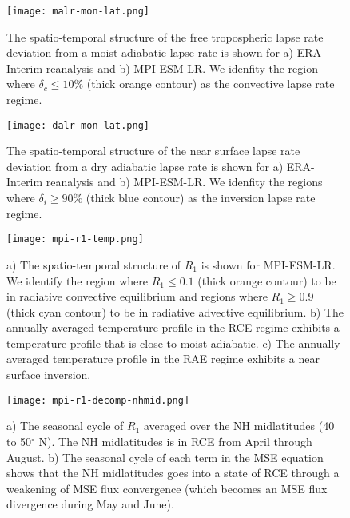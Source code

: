 \documentclass{ametsocV5}
\begin{document}
\begin{figure}[t]
  \noindent\texttt{[image: malr-mon-lat.png]}\\
  \caption{The spatio-temporal structure of the free tropospheric lapse rate deviation from a moist adiabatic lapse rate is shown for a) ERA-Interim reanalysis and b) MPI-ESM-LR. We idenfity the region where \(\delta_{c}\le 10\%\) (thick orange contour) as the convective lapse rate regime.}
  \label{fig:malr-mon-lat}
\end{figure}

\begin{figure}[t]
  \noindent\texttt{[image: dalr-mon-lat.png]}\\
  \caption{The spatio-temporal structure of the near surface lapse rate deviation from a dry adiabatic lapse rate is shown for a) ERA-Interim reanalysis and b) MPI-ESM-LR. We idenfity the regions where \(\delta_{i}\ge 90\%\) (thick blue contour) as the inversion lapse rate regime.}
  \label{fig:dalr-mon-lat}
\end{figure}

\begin{figure}[t]
  \noindent\texttt{[image: mpi-r1-temp.png]}\\
  \caption{a) The spatio-temporal structure of \(R_{1}\) is shown for MPI-ESM-LR. We identify the region where \(R_{1}\le 0.1\) (thick orange contour) to be in radiative convective equilibrium and regions where \(R_{1}\ge 0.9\) (thick cyan contour) to be in radiative advective equilibrium. b) The annually averaged temperature profile in the RCE regime exhibits a temperature profile that is close to moist adiabatic. c) The annually averaged temperature profile in the RAE regime exhibits a near surface inversion.}
  \label{fig:mpi-r1-temp}
\end{figure}

\begin{figure}[t]
  \noindent\texttt{[image: mpi-r1-decomp-nhmid.png]}\\
  \caption{a) The seasonal cycle of \(R_{1}\) averaged over the NH midlatitudes (40 to 50$^{\circ}$ N). The NH midlatitudes is in RCE from April through August. b) The seasonal cycle of each term in the MSE equation shows that the NH midlatitudes goes into a state of RCE through a weakening of MSE flux convergence (which becomes an MSE flux divergence during May and June).}
  \label{fig:mpi-r1-decomp-nhmid}
\end{figure}
\end{document}
